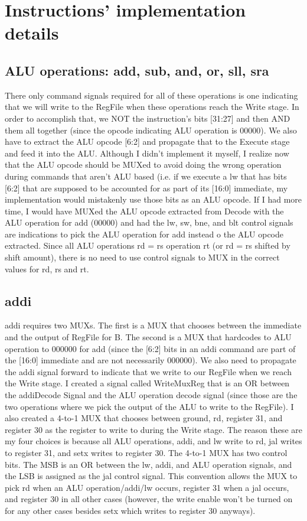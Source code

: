 \documentclass[letterpaper]{article} %
\begin{document}
       \FloatBarrier


\section{Instructions' implementation details}

    \subsection{ALU operations: add, sub, and, or, sll, sra}
        There only command signals required for all of these operations is one indicating that we will write to the RegFile when these operations reach the Write stage. In order to accomplish that, we NOT the instruction's bits [31:27] and then AND them all together (since the opcode indicating ALU operation is 00000). We also have to extract the ALU opcode [6:2] and propagate that to the Execute stage and feed it into the ALU. Although I didn't implement it myself, I realize now that the ALU opcode should be MUXed to avoid doing the wrong operation during commands that aren't ALU based (i.e. if we execute a lw that has bits [6:2] that are supposed to be accounted for as part of its [16:0] immediate, my implementation would mistakenly use those bits as an ALU opcode. If I had more time, I would have MUXed the ALU opcode extracted from Decode with the ALU operation for add (00000) and had the lw, sw, bne, and blt control signals are indications to pick the ALU operation for add instead o the ALU opcode extracted. Since all ALU operations rd = rs operation rt (or rd = rs shifted by shift amount), there is no need to use control signals to MUX in the correct values for rd, rs and rt. \\
    
    \subsection{addi}
        addi requires two MUXs. The first is a MUX that chooses between the immediate and the output of RegFile for B. The second is a MUX that hardcodes to ALU operation to 000000 for add (since the [6:2] bits in an addi command are part of the [16:0] immediate and are not necessarily 000000). We also need to propagate the addi signal forward to indicate that we write to our RegFile when we reach the Write stage. I created a signal called WriteMuxReg that is an OR between the addiDecode Signal and the ALU operation decode signal (since those are the two operations where we pick the output of the ALU to write to the RegFile). I also created a 4-to-1 MUX that chooses between ground, rd, register 31, and register 30 as the register to write to during the Write stage. The reason these are my four choices is because all ALU operations, addi, and lw write to rd, jal writes to register 31, and setx writes to register 30. The 4-to-1 MUX has two control bits. The MSB is an OR between the lw, addi, and ALU operation signals, and the LSB is assigned as the jal control signal. This convention allows the MUX to pick rd when an ALU operation/addi/lw occurs, register 31 when a jal occurs, and register 30 in all other cases (however, the write enable won't be turned on for any other cases besides setx which writes to register 30 anyways). 
        
\end{document}
